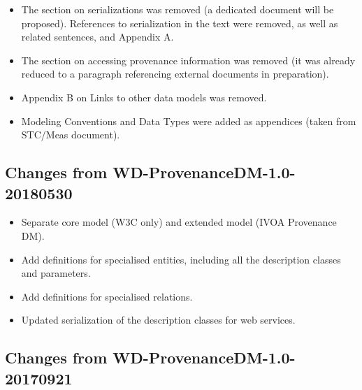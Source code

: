 \begin{itemize}
\item The section on serializations was removed (a dedicated document will be proposed). References to serialization in the text were removed, as well as related sentences, and Appendix A.
\item The section on accessing provenance information was removed (it was already reduced to a paragraph referencing external documents in preparation).
\item Appendix B on Links to other data models was removed.
\item Modeling Conventions and Data Types were added as appendices (taken from STC/Meas document).
\end{itemize}


\subsection{Changes from WD-ProvenanceDM-1.0-20180530}

\begin{itemize}
\item Separate core model (W3C only) and extended model (IVOA Provenance DM).
\item Add definitions for specialised entities, including all the description classes and parameters.
\item Add definitions for specialised relations.
\item Updated serialization of the description classes for web services.
\end{itemize}


\subsection{Changes from WD-ProvenanceDM-1.0-20170921}

